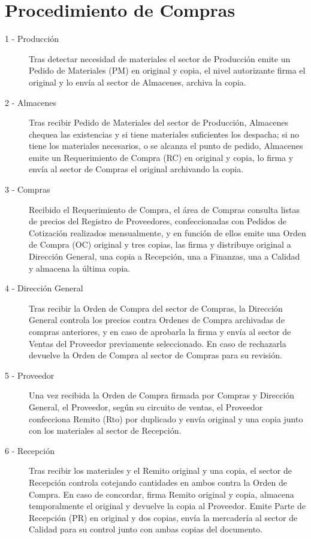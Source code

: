 \section{Procedimiento de Compras}
\begin{description}
\item[1 - Producción] Tras detectar necesidad de materiales el sector de Producción emite un Pedido de Materiales (PM) en original y copia, el nivel autorizante firma el original y lo envía al sector de Almacenes, archiva la copia.
\item[2 - Almacenes] Tras recibir Pedido de Materiales del sector de Producción, Almacenes chequea las existencias y si tiene materiales suficientes los despacha; si no tiene los materiales necesarios, o se alcanza el punto de pedido, Almacenes emite un Requerimiento de Compra (RC) en original y copia, lo firma y envía al sector de Compras el original archivando la copia.
\item[3 - Compras] Recibido el Requerimiento de Compra, el área de Compras consulta listas de precios del Registro de Proveedores, confeccionadas con Pedidos de Cotización realizados mensualmente, y en función de ellos emite una Orden de Compra (OC) original y tres copias, las firma y distribuye original a Dirección General, una copia a Recepción, una a Finanzas, una a Calidad y almacena la última copia.
\item [4 - Dirección General] Tras recibir la Orden de Compra del sector de Compras, la Dirección General controla los precios contra Ordenes de Compra archivadas de compras anteriores, y en caso de aprobarla la firma y envía al sector de Ventas del Proveedor previamente seleccionado. En caso de rechazarla devuelve la Orden de Compra al sector de Compras para su revisión.
\item [5 - Proveedor] Una vez recibida la Orden de Compra firmada por Compras y Dirección General, el Proveedor, según su circuito de ventas, el Proveedor confecciona Remito (Rto) por duplicado y envía original y una copia junto con los materiales al sector de Recepción.
\item[6 - Recepción] Tras recibir los materiales y el Remito original y una copia, el sector de Recepción controla cotejando cantidades en ambos contra la Orden de Compra. En caso de concordar, firma Remito original y copia, almacena temporalmente el original y devuelve la copia al Proveedor. Emite Parte de Recepción (PR) en original y dos copias, envía la mercadería al sector de Calidad para su control junto con ambas copias del documento.

\end{description}
